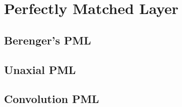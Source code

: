 \section{Perfectly Matched Layer}

\subsection{Berenger's PML}
\subsection{Unaxial PML}
\subsection{Convolution PML}
